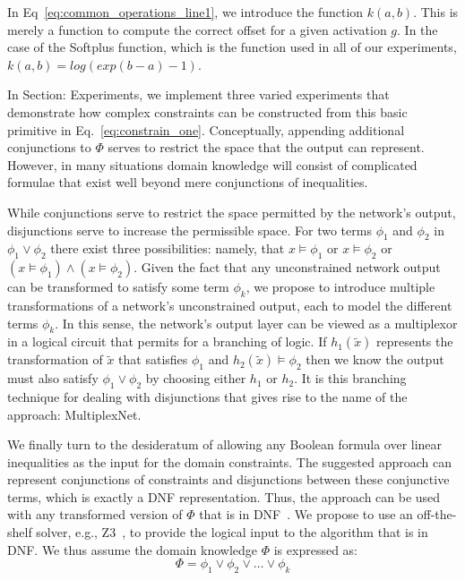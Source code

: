 \documentclass[letterpaper]{article} %
\begin{document}
In Eq~\ref{eq:common_operations_line1}, we introduce the function $k(a, b)$.
This is merely a function to compute the correct offset for a given activation $g$.
In the case of the Softplus function, which is the function used in all of our experiments, $k(a,b) = log(exp(b-a) -1)$.

In Section: Experiments, we implement three varied experiments that demonstrate how complex constraints can be constructed from this basic primitive in Eq.~\ref{eq:constrain_one}.
Conceptually, appending additional conjunctions to $\Phi$ serves to restrict the space that the output can represent.
However, in many situations domain knowledge will consist of complicated formulae that exist well beyond mere conjunctions of inequalities.

While conjunctions serve to restrict the space permitted by the network's output, disjunctions serve to increase the permissible space.
For two terms $\phi_1$ and $\phi_2$ in $\phi_1 \lor \phi_2$ there exist three possibilities: namely,
that $x \models \phi_1$ or $x \models \phi_2$ or $(x \models \phi_1) \land (x \models \phi_2)$.
Given the fact that any unconstrained network output can be transformed to satisfy some term $\phi_k$, we propose to introduce multiple transformations of a network's unconstrained output, each to model the different terms $\phi_k$.
In this sense, the network's output layer can be viewed as a multiplexor in a logical circuit that permits for a branching of logic.
If $h_1(\tilde{x})$ represents the transformation of $\tilde{x}$ that satisfies $\phi_1$ and $h_2(\tilde{x}) \models \phi_2$ then we know the output must also satisfy $\phi_1 \lor \phi_2$ by choosing either $h_1$ or $h_2$.
It is this branching technique for dealing with disjunctions that gives rise to the name of the approach: MultiplexNet.

We finally turn to the desideratum of allowing any Boolean formula over linear inequalities as the input for the domain constraints.
The suggested approach can represent conjunctions of constraints and disjunctions between these conjunctive terms, which is exactly a DNF representation.
Thus, the approach can be used with any transformed version of $\Phi$ that is in DNF~\citep{darwiche2002knowledge}.
We propose to use an off-the-shelf solver, e.g., Z3~\citep{de2008z3}, to provide the logical input to the algorithm that is in DNF.
We thus assume the domain knowledge $\Phi$ is expressed as:
\begin{equation}
    \label{eq:dnf_representation}
    \Phi = \phi_1 \lor \phi_2 \lor \hdots \lor \phi_k
\end{equation}
\end{document}
